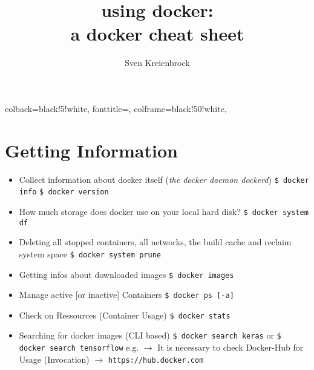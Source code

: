 \documentclass[]{scrartcl}
\title{using docker:\\a docker cheat sheet}
\author{Sven Kreienbrock}
\begin{document}
{
    colback=black!5!white,
	fonttitle=,
	colframe=black!50!white,
}
\maketitle

\begin{abstract}
\end{abstract}

\section{Getting Information}

\begin{mybox}
	\begin{itemize}
		\item Collect information about docker itself (\textit{the docker daemon \textsf{dockerd}})
		\subitem \texttt{\$ docker info} 
		\subitem \texttt{\$ docker version}
		\item How much storage does docker use on your local hard disk?
		\subitem  \texttt{\$ docker system df}
		\item Deleting all stopped containers, all networks, the build cache and reclaim system space
		\subitem \texttt{\$ docker system prune}
		\item Getting infos about downloaded images
		\subitem \texttt{\$ docker images}
		\item Manage active [or inactive] Containers
		\subitem \texttt{\$ docker ps [-a]}
		\item Check on Ressources (Container Usage)
		\subitem \texttt{\$ docker stats}
		\item Searching for docker images (CLI based)
		\subitem \texttt{\$ docker search keras} or \texttt{\$ docker search tensorflow} e.g.
		\subitem \(\rightarrow\) It is necessary to check Docker-Hub for Usage (Invocation)
		\subitem \(\rightarrow\) \texttt{https://hub.docker.com}
	\end{itemize}
\end{mybox}
\end{document}
